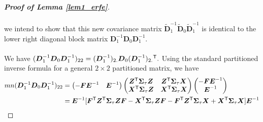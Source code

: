 \documentclass[15pt,a4paper]{article}
\newcommand{\transpose}{{}^{\text{\sffamily T}}}
\begin{document}
\begin{proof}[\textbf{Proof of Lemma \ref{lem1_erfe}}]$ $ ~~\\~~\\
we intend to show that this new covariance matrix $\widetilde{\boldsymbol{D}}_1^{-1}\widetilde{\boldsymbol{D}}_0\widetilde{\boldsymbol{D}}_1^{-1}$ is identical to the lower right diagonal block matrix $\boldsymbol{D}_1^{-1}\boldsymbol{D}_0\boldsymbol{D}_1^{-1}.$
 ~~\\
 ~~\\
We have $(\boldsymbol{D}_1^{-1}\boldsymbol{D}_0\boldsymbol{D}_1^{-1})_{22}=(\boldsymbol{D}_1^{-1})_{2.}\boldsymbol{D}_0(\boldsymbol{D}_1^{-1})_{2.}\transpose.$ Using the standard partitioned inverse formula for a general $2\times 2$ partitioned matrix, we have
\begin{equation*} 
\begin{split}
mn(\boldsymbol{D}_1^{-1}\boldsymbol{D}_0\boldsymbol{D}_1^{-1})_{22} & = 
\begin{pmatrix}
-\boldsymbol{F}\boldsymbol{E}^{-1} & \boldsymbol{E}^{-1}\\
\end{pmatrix} 
 \begin{pmatrix}
  \boldsymbol{Z}\transpose\boldsymbol{\Sigma}_{\tau}\boldsymbol{Z} & \boldsymbol{Z}\transpose\boldsymbol{\Sigma}_{\tau}\boldsymbol{X}  \\
  \boldsymbol{X}\transpose\boldsymbol{\Sigma}_{\tau}\boldsymbol{Z}  & \boldsymbol{X}\transpose\boldsymbol{\Sigma}_{\tau}\boldsymbol{X}  
 \end{pmatrix}
 \begin{pmatrix}
-\boldsymbol{F}\boldsymbol{E}^{-1} \\
\boldsymbol{E}^{-1}
\end{pmatrix}\\
 & = \boldsymbol{E}^{-1}[\boldsymbol{F}\transpose\boldsymbol{Z}\transpose\boldsymbol{\Sigma}_{\tau}\boldsymbol{Z}\boldsymbol{F}-
 \boldsymbol{X}\transpose\boldsymbol{\Sigma}_{\tau}\boldsymbol{Z}\boldsymbol{F}-\boldsymbol{F}\transpose\boldsymbol{Z}\transpose\boldsymbol{\Sigma}_{\tau}
 \boldsymbol{X}+\boldsymbol{X}\transpose\boldsymbol{\Sigma}_{\tau}\boldsymbol{X}]\boldsymbol{E}^{-1}

\end{split}
\end{equation*}
\end{proof}
\end{document}
